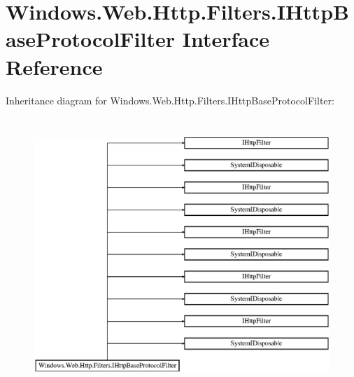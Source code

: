 \hypertarget{interface_windows_1_1_web_1_1_http_1_1_filters_1_1_i_http_base_protocol_filter}{}\section{Windows.\+Web.\+Http.\+Filters.\+I\+Http\+Base\+Protocol\+Filter Interface Reference}
\label{interface_windows_1_1_web_1_1_http_1_1_filters_1_1_i_http_base_protocol_filter}
Inheritance diagram for Windows.\+Web.\+Http.\+Filters.\+I\+Http\+Base\+Protocol\+Filter\+:\begin{figure}[H]
\begin{center}
\leavevmode
\includegraphics[height=10.370371cm]{interface_windows_1_1_web_1_1_http_1_1_filters_1_1_i_http_base_protocol_filter}
\end{center}
\end{figure}
